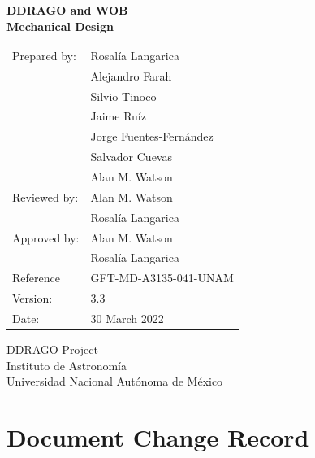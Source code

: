 \documentclass{report}
\begin{document}
\pagestyle{empty}

\begin{center}
\Large \bfseries
DDRAGO and WOB\\Mechanical Design
\end{center}

\vspace{2cm}

\begin{center}

\begin{center}
\begin{tabular}{ll}
Prepared by:&Rosalía Langarica\\
&Alejandro Farah\\
&Silvio Tinoco\\
&Jaime Ruíz\\
&Jorge Fuentes-Fernández\\
&Salvador Cuevas\\
&Alan M. Watson\\
Reviewed by:&Alan M. Watson\\
&Rosalía Langarica\\
Approved by:&Alan M. Watson\\
&Rosalía Langarica\\
Reference&GFT-MD-A3135-041-UNAM\\
Version:& 3.3\\
Date:&30 March 2022\\
\end{tabular}
\end{center}

\vspace{\fill}

DDRAGO Project\\
Instituto de Astronomí­a\\
Universidad Nacional Autónoma de México
\end{center}

\clearpage
\section*{Document Change Record}
\end{document}
